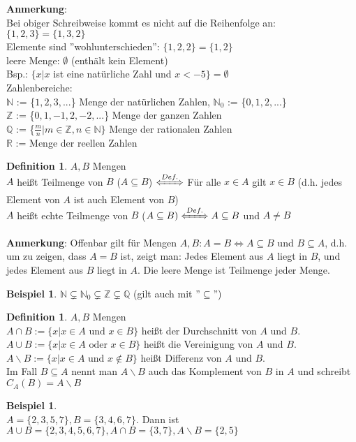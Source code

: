 \documentclass[10pt,a4paper,numbers=endperiod]{scrartcl}
\theoremstyle{definition}
\newtheorem{defi}[satz]{Definition}
\newtheorem{bsp}[satz]{Beispiel}
\begin{document}
\textbf{Anmerkung}:\\ 
Bei obiger Schreibweise kommt es nicht auf die Reihenfolge an: $\{1,2,3\}=\{1,3,2\}$\\
Elemente sind ''wohlunterschieden'': $\{1,2,2\} = \{1,2\}$\\
leere Menge: $\emptyset$ (enthält kein Element)\\
Bsp.: $\{x|x$ ist eine natürliche Zahl und $x<-5\} = \emptyset$\\

Zahlenbereiche: \\
$\mathbb{N}$ := \{$1,2,3,...$\} Menge der natürlichen Zahlen, $\mathbb{N}_{0}$ := \{$0,1,2,...$\}\\ 
$\mathbb{Z}$ := \{$0,1,-1,2,-2,...$\} Menge der ganzen Zahlen\\
$\mathbb{Q}$ := \{$\frac{m}{n}|m \in \mathbb{Z}, n \in \mathbb{N}\}$ Menge der rationalen Zahlen\\
$\mathbb{R}$ := Menge der reellen Zahlen

\begin{defi}
	$A, B$ Mengen\\
	$A$ heißt Teilmenge von $B$ ($A \subseteq B$) $\xLeftrightarrow[]{Def.}$ Für alle $x \in A$ gilt $x \in B$ (d.h. jedes Element von $A$ ist auch Element von $B$)\\
	$A$ heißt echte Teilmenge von $B$ ($A \subseteq B) \xLeftrightarrow[]{Def.} A \subseteq B$ und $A \neq B$
\end{defi}

\textbf{Anmerkung}: Offenbar gilt für Mengen $A, B: A=B \Leftrightarrow A \subseteq B$ und $B \subseteq  A$, d.h. um zu zeigen, dass $A=B$ ist, zeigt man: Jedes Element aus $A$ liegt in $B$, und jedes Element aus $B$ liegt in $A$. Die leere Menge ist Teilmenge jeder Menge. 

\begin{bsp}
	$\mathbb{N} \subsetneq \mathbb{N}_{0} \subsetneq \mathbb{Z} \subsetneq \mathbb{Q}$ (gilt auch mit ''$\subseteq$'')
\end{bsp}

\begin{defi}
	$A,B$ Mengen\\
	$A \cap B := \{x|x \in A \text{ und } x \in B \}$ heißt der Durchschnitt von $A$ und $B$.\\
	$A \cup B := \{x|x \in A \text{ oder } x \in B \}$ heißt die Vereinigung von $A$ und $B$.\\
	$A \backslash B := \{x|x \in A \text{ und } x \notin B \}$ heißt Differenz von $A$ und $B$.\\
	Im Fall $B \subseteq A$ nennt man $A \backslash B$ auch das Komplement von $B$ in $A$ und schreibt $C_A(B)= A \backslash B $
\end{defi}
\begin{bsp} $ $ \\
	$A=\{2,3,5,7\}, B=\{3,4,6,7\}$. Dann ist $A \cup B = \{2,3,4,5,6,7\}, A \cap B = \{3,7\}, A \backslash B = \{2,5\}$
\end{bsp}
\end{document}
